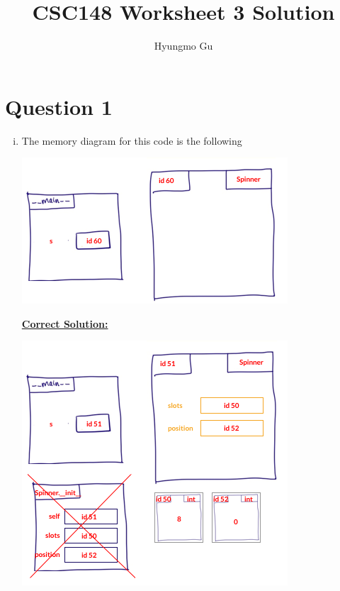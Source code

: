\documentclass[12pt]{article}
\begin{document}
\title{CSC148 Worksheet 3 Solution}
\author{Hyungmo Gu}
\maketitle

\section*{Question 1}
\begin{enumerate}[i.]
    \item

    The memory diagram for this code is the following

    \begin{center}
    \includegraphics[width=0.7\linewidth]{images/worksheet_3_q1a_solution.png}
    \end{center}

    \begin{mdframed}
        \underline{\textbf{Correct Solution:}}

        \bigskip

        \begin{center}
        \includegraphics[width=0.7\linewidth]{images/worksheet_3_q1a_correction.png}
        \end{center}
    \end{mdframed}


\end{enumerate}
\end{document}
